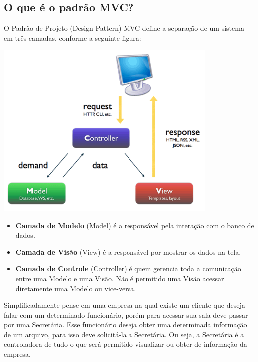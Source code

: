 \documentclass[a4paper,11pt]{article}
\begin{document}
\subsection{O que é o padrão MVC?}
O Padrão de Projeto (Design Pattern) MVC define a separação de um sistema em três camadas, conforme a seguinte figura:
\begin{center} 
\includegraphics[width=0.8\textwidth]{mvc.png}
\end{center}
\begin{itemize}
  \item \textbf{Camada de Modelo} (Model) é a responsável pela interação com o banco de dados. 
  \item \textbf{Camada de Visão} (View) é a responsável por mostrar os dados na tela.
  \item \textbf{Camada de Controle} (Controller) é quem gerencia toda a comunicação entre uma Modelo e uma Visão. Não é permitido uma Visão acessar diretamente uma Modelo ou vice-versa.
\end{itemize}
Simplificadamente pense em uma empresa na qual existe um cliente que deseja falar com um determinado funcionário, porém para acessar sua sala deve passar por uma Secretária. Esse funcionário deseja obter uma determinada informação de um arquivo, para isso deve solicitá-la a Secretária. Ou seja, a Secretária é a controladora de tudo o que será permitido visualizar ou obter de informação da empresa.
\end{document}
